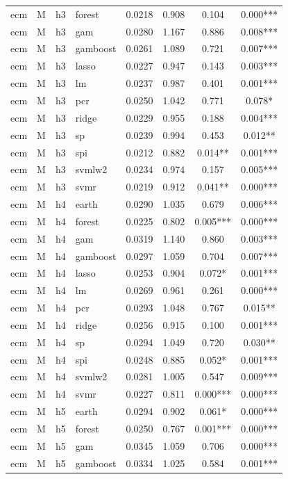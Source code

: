 \begin{ThreePartTable}
\begin{longtable}[t]{llclcccc}
ecm & M & h3 & forest & 0.0218 & 0.908 & 0.104 & 0.000***\\
ecm & M & h3 & gam & 0.0280 & 1.167 & 0.886 & 0.008***\\
ecm & M & h3 & gamboost & 0.0261 & 1.089 & 0.721 & 0.007***\\
ecm & M & h3 & lasso & 0.0227 & 0.947 & 0.143 & 0.003***\\
ecm & M & h3 & lm & 0.0237 & 0.987 & 0.401 & 0.001***\\
ecm & M & h3 & pcr & 0.0250 & 1.042 & 0.771 & 0.078*\\
ecm & M & h3 & ridge & 0.0229 & 0.955 & 0.188 & 0.004***\\
ecm & M & h3 & sp & 0.0239 & 0.994 & 0.453 & 0.012**\\
ecm & M & h3 & spi & 0.0212 & 0.882 & 0.014** & 0.001***\\
ecm & M & h3 & svmlw2 & 0.0234 & 0.974 & 0.157 & 0.005***\\
ecm & M & h3 & svmr & 0.0219 & 0.912 & 0.041** & 0.000***\\
\addlinespace
ecm & M & h4 & earth & 0.0290 & 1.035 & 0.679 & 0.006***\\
ecm & M & h4 & forest & 0.0225 & 0.802 & 0.005*** & 0.000***\\
ecm & M & h4 & gam & 0.0319 & 1.140 & 0.860 & 0.003***\\
ecm & M & h4 & gamboost & 0.0297 & 1.059 & 0.704 & 0.007***\\
ecm & M & h4 & lasso & 0.0253 & 0.904 & 0.072* & 0.001***\\
ecm & M & h4 & lm & 0.0269 & 0.961 & 0.261 & 0.000***\\
ecm & M & h4 & pcr & 0.0293 & 1.048 & 0.767 & 0.015**\\
ecm & M & h4 & ridge & 0.0256 & 0.915 & 0.100 & 0.001***\\
ecm & M & h4 & sp & 0.0294 & 1.049 & 0.720 & 0.030**\\
ecm & M & h4 & spi & 0.0248 & 0.885 & 0.052* & 0.001***\\
ecm & M & h4 & svmlw2 & 0.0281 & 1.005 & 0.547 & 0.009***\\
ecm & M & h4 & svmr & 0.0227 & 0.811 & 0.000*** & 0.000***\\
\addlinespace
ecm & M & h5 & earth & 0.0294 & 0.902 & 0.061* & 0.000***\\
ecm & M & h5 & forest & 0.0250 & 0.767 & 0.001*** & 0.000***\\
ecm & M & h5 & gam & 0.0345 & 1.059 & 0.706 & 0.000***\\
ecm & M & h5 & gamboost & 0.0334 & 1.025 & 0.584 & 0.001***\\

\end{longtable}
\end{ThreePartTable}
